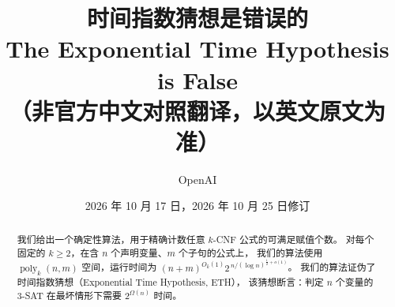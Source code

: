 \documentclass[11pt,reqno]{amsart}
\title{时间指数猜想是错误的\\[0.6em]
 {\large\textmd{The Exponential Time Hypothesis is False}}\\[0.2em]
 {\small\textmd{（非官方中文对照翻译，以英文原文为准）}}}
\author{OpenAI}
\date{2026 年 10 月 17 日，2026 年 10 月 25 日修订}
\numberwithin{equation}{section}
\theoremstyle{definition}\newtheorem{definition}[theorem]{定义}
\theoremstyle{remark}\newtheorem{remark}[theorem]{注}
\newcommand{\poly}{\operatorname{poly}}
\renewcommand{\ge}{\geqslant}
\begin{document}
\begin{abstract}
我们给出一个确定性算法，用于精确计数任意 $k$-CNF 公式的可满足赋值个数。
对每个固定的 $k\ge2$，在含 $n$ 个声明变量、$m$ 个子句的公式上，
我们的算法使用 $\poly_k(n,m)$ 空间，运行时间为
$(n+m)^{O_k(1)}2^{\,n/(\log n)^{\frac12+o(1)}}$。
我们的算法证伪了时间指数猜想（Exponential Time Hypothesis, ETH），
该猜想断言：判定 $n$ 个变量的 $3$-SAT 在最坏情形下需要
$2^{\Omega(n)}$ 时间。
\end{abstract}
\maketitle

\tableofcontents
\vspace{-\baselineskip}
\end{document}
